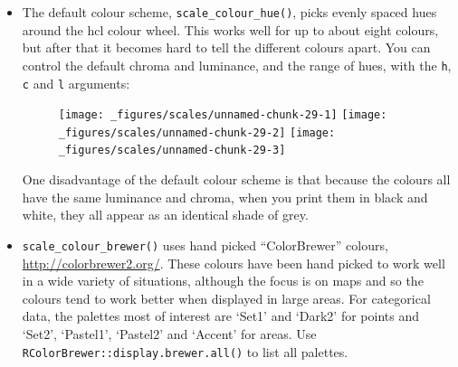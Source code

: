 \begin{itemize}
\item
  The default colour scheme, \texttt{scale\_colour\_hue()}, picks evenly
  spaced hues around the hcl colour wheel. This works well for up to
  about eight colours, but after that it becomes hard to tell the
  different colours apart. You can control the default chroma and
  luminance, and the range of hues, with the \texttt{h}, \texttt{c} and
  \texttt{l} arguments:

\begin{Shaded}
\begin{Highlighting}[]
\StringTok{ }\NormalTok{(} \NormalTok{)}
\StringTok{ }\NormalTok{(} \NormalTok{(}\NormalTok{, }\NormalTok{))}
\end{Highlighting}
\end{Shaded}

  \begin{figure}[H]
    \texttt{[image: \_figures/scales/unnamed-chunk-29-1]}%
    \texttt{[image: \_figures/scales/unnamed-chunk-29-2]}%
    \texttt{[image: \_figures/scales/unnamed-chunk-29-3]}
  \end{figure}

  One disadvantage of the default colour scheme is that because the
  colours all have the same luminance and chroma, when you print them in
  black and white, they all appear as an identical shade of grey.
\item
  \texttt{scale\_colour\_brewer()} uses hand picked ``ColorBrewer''
  colours, \url{http://colorbrewer2.org/}. These colours have been hand
  picked to work well in a wide variety of situations, although the
  focus is on maps and so the colours tend to work better when displayed
  in large areas. For categorical data, the palettes most of interest
  are `Set1' and `Dark2' for points and `Set2', `Pastel1', `Pastel2' and
  `Accent' for areas. Use \texttt{RColorBrewer::display.brewer.all()} to
  list all palettes. 

\begin{Shaded}
\begin{Highlighting}[]
\StringTok{ }\NormalTok{(} \NormalTok{)}
\StringTok{ }\NormalTok{(} \NormalTok{)}
\StringTok{ }\NormalTok{(} \NormalTok{)}
\end{Highlighting}
\end{Shaded}


\end{itemize}
